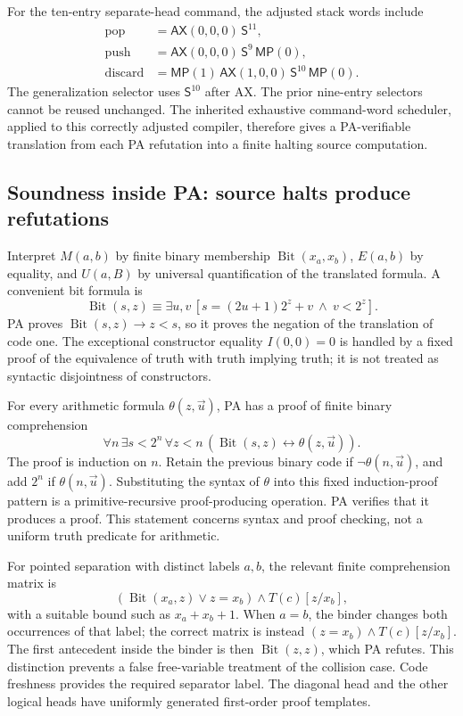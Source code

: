 For the ten-entry separate-head command, the adjusted stack words include
\[
\begin{aligned}
 \mathrm{pop}&=\mathsf{AX}(0,0,0)\,\mathsf S^{11},\\
 \mathrm{push}&=\mathsf{AX}(0,0,0)\,\mathsf S^9\,\mathsf{MP}(0),\\
 \mathrm{discard}&=\mathsf{MP}(1)\,\mathsf{AX}(1,0,0)\,
                       \mathsf S^{10}\,\mathsf{MP}(0).
\end{aligned}
\]
The generalization selector uses $\mathsf S^{10}$ after AX. The prior
nine-entry selectors cannot be reused unchanged. The inherited exhaustive
command-word scheduler, applied to this correctly adjusted compiler,
therefore gives a PA-verifiable translation from each PA refutation into
a finite halting source computation.

\subsection{Soundness inside PA: source halts produce refutations}

Interpret $M(a,b)$ by finite binary membership $\operatorname{Bit}(x_a,x_b)$,
$E(a,b)$ by equality, and $U(a,B)$ by universal quantification of the
translated formula. A convenient bit formula is
\[
 \operatorname{Bit}(s,z)\equiv
 \exists u,v\,[s=(2u+1)2^z+v\ \wedge\ v<2^z].
\]
PA proves $\operatorname{Bit}(s,z)\to z<s$, so it proves the negation of
the translation of code one. The exceptional constructor equality
$I(0,0)=0$ is handled by a fixed proof of the equivalence of truth with
truth implying truth; it is not treated as syntactic disjointness of
constructors.

For every arithmetic formula $\theta(z,\vec u)$, PA has a proof of finite
binary comprehension
\[
 \forall n\,\exists s<2^n\,\forall z<n\,
       (\operatorname{Bit}(s,z)\leftrightarrow\theta(z,\vec u)).
\]
The proof is induction on $n$. Retain the previous binary code if
$\neg\theta(n,\vec u)$, and add $2^n$ if $\theta(n,\vec u)$. Substituting
the syntax of $\theta$ into this fixed induction-proof pattern is a
primitive-recursive proof-producing operation. PA verifies that it produces
a proof. This statement concerns syntax and proof checking, not a uniform
truth predicate for arithmetic.

For pointed separation with distinct labels $a,b$, the relevant finite
comprehension matrix is
\[
 (\operatorname{Bit}(x_a,z)\lor z=x_b)\wedge T(c)[z/x_b],
\]
with a suitable bound such as $x_a+x_b+1$. When $a=b$, the binder changes
both occurrences of that label; the correct matrix is instead
$(z=x_b)\wedge T(c)[z/x_b]$. The first antecedent inside the binder is
then $\operatorname{Bit}(z,z)$, which PA refutes. This distinction prevents
a false free-variable treatment of the collision case. Code freshness
provides the required separator label. The diagonal head and the other
logical heads have uniformly generated first-order proof templates.

